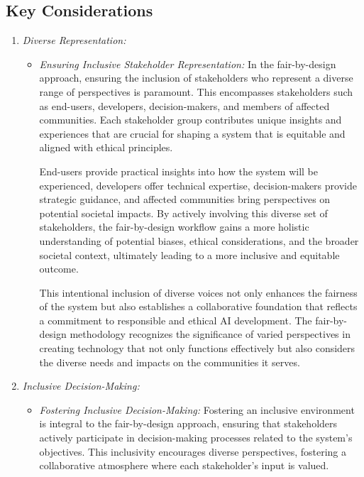 \documentclass[12pt,a4paper,openright,twoside]{book}
\begin{document}
\subsection{Key Considerations}

\begin{enumerate}

    \item \emph{Diverse Representation:}

        \begin{itemize}

            \item \emph{Ensuring Inclusive Stakeholder Representation:} In the fair-by-design approach, ensuring the inclusion of stakeholders who represent a diverse range of perspectives is paramount. This encompasses stakeholders such as end-users, developers, decision-makers, and members of affected communities. Each stakeholder group contributes unique insights and experiences that are crucial for shaping a system that is equitable and aligned with ethical principles.

            End-users provide practical insights into how the system will be experienced, developers offer technical expertise, decision-makers provide strategic guidance, and affected communities bring perspectives on potential societal impacts. By actively involving this diverse set of stakeholders, the fair-by-design workflow gains a more holistic understanding of potential biases, ethical considerations, and the broader societal context, ultimately leading to a more inclusive and equitable outcome.
            
            This intentional inclusion of diverse voices not only enhances the fairness of the system but also establishes a collaborative foundation that reflects a commitment to responsible and ethical AI development. The fair-by-design methodology recognizes the significance of varied perspectives in creating technology that not only functions effectively but also considers the diverse needs and impacts on the communities it serves.

        \end{itemize}
    
    \item \emph{Inclusive Decision-Making:}
        
    \begin{itemize}
    
        \item \emph{Fostering Inclusive Decision-Making:} Fostering an inclusive environment is integral to the fair-by-design approach, ensuring that stakeholders actively participate in decision-making processes related to the system's objectives. This inclusivity encourages diverse perspectives, fostering a collaborative atmosphere where each stakeholder's input is valued.


\end{itemize}
\end{enumerate}
\end{document}

